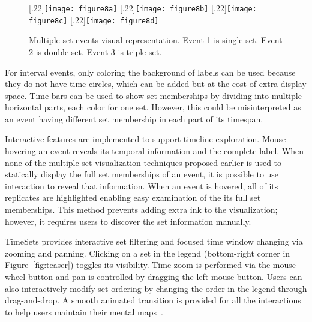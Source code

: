 \begin{figure}[ht]
	\centering
	[.22\columnwidth]{\texttt{[image: figure8a]}}
	\hfill
	[.22\columnwidth]{\texttt{[image: figure8b]}}
	\hfill
	[.22\columnwidth]{\texttt{[image: figure8c]}}
	\hfill
	[.22\columnwidth]{\texttt{[image: figure8d]}}
	\caption{Multiple-set events visual representation. Event 1 is single-set. Event 2 is double-set. Event 3 is triple-set.}
	\label{fig:eventmembership}
\end{figure}

For interval events, only coloring the background of labels can be used because they do not have time circles, which can be added but at the cost of extra display space. Time bars can be used to show set memberships by dividing into multiple horizontal parts, each color for one set. However, this could be misinterpreted as an event having different set membership in each part of its timespan.



\label{sub:interaction}
Interactive features are implemented to support timeline exploration. Mouse hovering an event reveals its temporal information and the complete label. When none of the multiple-set visualization techniques proposed earlier is used to statically display the full set memberships of an event, it is possible to use interaction to reveal that information. When an event is hovered, all of its replicates are highlighted enabling easy examination of the its full set memberships. This method prevents adding extra ink to the visualization; however, it requires users to discover the set information manually. 

TimeSets provides interactive set filtering and focused time window changing via zooming and panning. Clicking on a set in the legend (bottom-right corner in Figure~\ref{fig:teaser}) toggles its visibility. Time zoom is performed via the mouse-wheel button and pan is controlled by dragging the left mouse button. Users can also interactively modify set ordering by changing the order in the legend through drag-and-drop. A smooth animated transition is provided for all the interactions to help users maintain their mental maps~\cite{Elmqvist2011}.